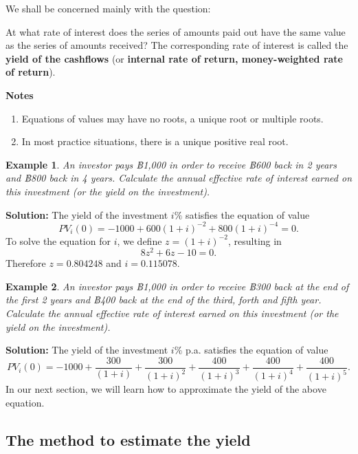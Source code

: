 \documentclass[landscape, 20pt]{extreport}
\theoremstyle{definition}
\theoremstyle{definition}
\newtheorem{example}{Example}[chapter]
\theoremstyle{definition}
\theoremstyle{definition}
\theoremstyle{remark}
\begin{document}
We shall be concerned mainly with the question:

At what rate of interest does the series of amounts paid out have the
same value as the series of amounts received? The corresponding rate of
interest is called the \textbf{yield of the cashflows} (or \textbf{internal rate of
return, money-weighted rate of return}).

\textbf{Notes}

\begin{enumerate}
\def\labelenumi{\arabic{enumi}.}
\item
  Equations of values may have no roots, a unique root or multiple
  roots.
\item
  In most practice situations, there is a unique positive real root.
\end{enumerate}

\newpage \begin{example}
\emph{An investor pays ฿1,000 in order to receive ฿600 back in 2 years and
฿800 back in 4 years. Calculate the annual effective rate of interest
earned on this investment (or the yield on the investment).}
\end{example}

\textbf{Solution:} The yield of the investment \(i\%\) satisfies the equation
of value \[PV_i(0) =  -1000 + 600(1+i)^{-2} + 800(1+i)^{-4} = 0.\] To
solve the equation for \(i\), we define \(z = (1+i)^{-2}\), resulting in
\[8z^2 + 6z - 10 = 0.\] Therefore \(z = 0.804248\) and \(i = 0.115078.\)

\newpage \begin{example}
\protect\hypertarget{exm:exampleYield}{}\label{exm:exampleYield}\emph{An investor pays ฿1,000 in order to receive ฿300 back at the end of the
first 2 years and ฿400 back at the end of the third, forth and fifth
year. Calculate the annual effective rate of interest earned on this
investment (or the yield on the investment).}
\end{example}

\textbf{Solution:} The yield of the investment \(i\%\) p.a. satisfies the
equation of value
\[PV_i(0) =  -1000 + \frac{300}{(1+i)} + \frac{300}{(1+i)^{2}} + \frac{400}{(1+i)^{3}} +  \frac{400}{(1+i)^{4}} + \frac{400}{(1+i)^{5}}.\]
In our next section, we will learn how to approximate the yield of the
above equation.

\newpage \hypertarget{the-method-to-estimate-the-yield}{%
\subsection{The method to estimate the yield}\label{the-method-to-estimate-the-yield}}
\end{document}
